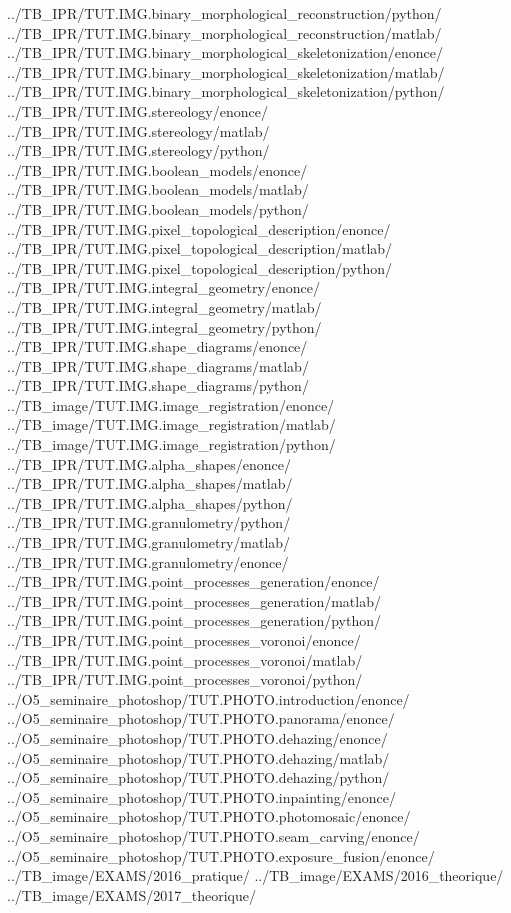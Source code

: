 {  {../TB_IPR/TUT.IMG.binary_morphological_reconstruction/python/}
  {../TB_IPR/TUT.IMG.binary_morphological_reconstruction/matlab/}
  {../TB_IPR/TUT.IMG.binary_morphological_skeletonization/enonce/}
  {../TB_IPR/TUT.IMG.binary_morphological_skeletonization/matlab/}
  {../TB_IPR/TUT.IMG.binary_morphological_skeletonization/python/}
  {../TB_IPR/TUT.IMG.stereology/enonce/}
  {../TB_IPR/TUT.IMG.stereology/matlab/}
  {../TB_IPR/TUT.IMG.stereology/python/}
  {../TB_IPR/TUT.IMG.boolean_models/enonce/}
  {../TB_IPR/TUT.IMG.boolean_models/matlab/}
  {../TB_IPR/TUT.IMG.boolean_models/python/}
  {../TB_IPR/TUT.IMG.pixel_topological_description/enonce/}
  {../TB_IPR/TUT.IMG.pixel_topological_description/matlab/}
  {../TB_IPR/TUT.IMG.pixel_topological_description/python/}
  {../TB_IPR/TUT.IMG.integral_geometry/enonce/}
  {../TB_IPR/TUT.IMG.integral_geometry/matlab/}
  {../TB_IPR/TUT.IMG.integral_geometry/python/}
  {../TB_IPR/TUT.IMG.shape_diagrams/enonce/}
  {../TB_IPR/TUT.IMG.shape_diagrams/matlab/}
  {../TB_IPR/TUT.IMG.shape_diagrams/python/}
  {../TB_image/TUT.IMG.image_registration/enonce/}
  {../TB_image/TUT.IMG.image_registration/matlab/}
  {../TB_image/TUT.IMG.image_registration/python/}
  {../TB_IPR/TUT.IMG.alpha_shapes/enonce/}
  {../TB_IPR/TUT.IMG.alpha_shapes/matlab/}
  {../TB_IPR/TUT.IMG.alpha_shapes/python/}
  {../TB_IPR/TUT.IMG.granulometry/python/} 
  {../TB_IPR/TUT.IMG.granulometry/matlab/}
  {../TB_IPR/TUT.IMG.granulometry/enonce/}
  {../TB_IPR/TUT.IMG.point_processes_generation/enonce/}
  {../TB_IPR/TUT.IMG.point_processes_generation/matlab/}
  {../TB_IPR/TUT.IMG.point_processes_generation/python/}
  {../TB_IPR/TUT.IMG.point_processes_voronoi/enonce/}
  {../TB_IPR/TUT.IMG.point_processes_voronoi/matlab/}
  {../TB_IPR/TUT.IMG.point_processes_voronoi/python/}
  {../O5_seminaire_photoshop/TUT.PHOTO.introduction/enonce/}
  {../O5_seminaire_photoshop/TUT.PHOTO.panorama/enonce/}
  {../O5_seminaire_photoshop/TUT.PHOTO.dehazing/enonce/}
  {../O5_seminaire_photoshop/TUT.PHOTO.dehazing/matlab/}
  {../O5_seminaire_photoshop/TUT.PHOTO.dehazing/python/}
  {../O5_seminaire_photoshop/TUT.PHOTO.inpainting/enonce/}
  {../O5_seminaire_photoshop/TUT.PHOTO.photomosaic/enonce/}
  {../O5_seminaire_photoshop/TUT.PHOTO.seam_carving/enonce/}
  {../O5_seminaire_photoshop/TUT.PHOTO.exposure_fusion/enonce/}
  {../TB_image/EXAMS/2016_pratique/}  
  {../TB_image/EXAMS/2016_theorique/}
  {../TB_image/EXAMS/2017_theorique/}
}


\makeatletter
{}
\makeatother


